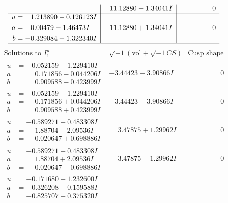 \documentclass[1p]{elsarticle_modified}
\theoremstyle{definition}
\newcommand{\I}{\sqrt{-1}}
\begin{document}
$$\begin{array}{c|c|c}
 & \phantom{-}11.12880 - 1.34041 I & \phantom{-0.000000 } 0 \\ \hline\begin{aligned}
u &= \phantom{-}1.213890 - 0.126123 I \\
a &= \phantom{-}0.00479 - 1.46473 I \\
b &= -0.329084 + 1.322340 I\end{aligned}
 & \phantom{-}11.12880 + 1.34041 I & \phantom{-0.000000 } 0\\
 \hline 
 \end{array}$$\newpage$$\begin{array}{c|c|c}  
\text{Solutions to }I^u_{1}& \I (\text{vol} + \sqrt{-1}CS) & \text{Cusp shape}\\
 \hline 
\begin{aligned}
u &= -0.052159 + 1.229410 I \\
a &= \phantom{-}0.171856 - 0.044206 I \\
b &= \phantom{-}0.909588 - 0.423999 I\end{aligned}
 & -3.44423 + 3.90866 I & \phantom{-0.000000 } 0 \\ \hline\begin{aligned}
u &= -0.052159 - 1.229410 I \\
a &= \phantom{-}0.171856 + 0.044206 I \\
b &= \phantom{-}0.909588 + 0.423999 I\end{aligned}
 & -3.44423 - 3.90866 I & \phantom{-0.000000 } 0 \\ \hline\begin{aligned}
u &= -0.589271 + 0.483308 I \\
a &= \phantom{-}1.88704 - 2.09536 I \\
b &= \phantom{-}0.020647 + 0.698886 I\end{aligned}
 & \phantom{-}3.47875 + 1.29962 I & \phantom{-0.000000 } 0 \\ \hline\begin{aligned}
u &= -0.589271 - 0.483308 I \\
a &= \phantom{-}1.88704 + 2.09536 I \\
b &= \phantom{-}0.020647 - 0.698886 I\end{aligned}
 & \phantom{-}3.47875 - 1.29962 I & \phantom{-0.000000 } 0 \\ \hline\begin{aligned}
u &= -0.171680 + 1.232600 I \\
a &= -0.326208 + 0.159588 I \\
b &= -0.825707 + 0.375320 I\end{aligned}

\end{array}$$
\end{document}
